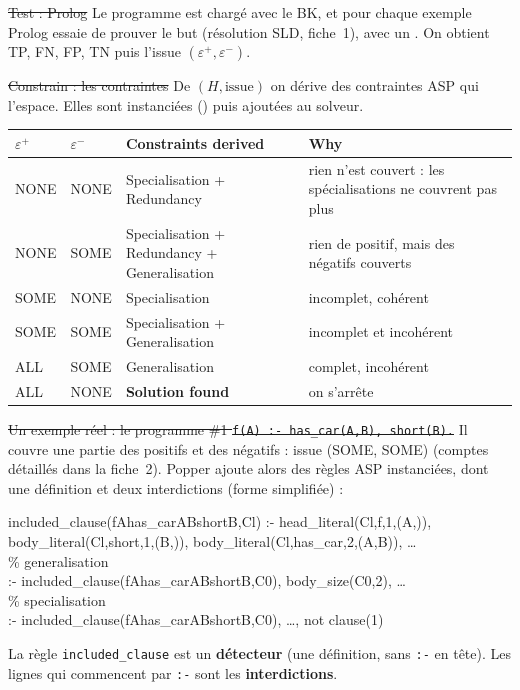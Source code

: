 \documentclass[10pt]{article}
\begin{document}
\st{Test : Prolog}
Le programme est chargé avec le BK, et pour chaque exemple Prolog essaie de prouver le but (résolution SLD, fiche~1), avec un .
On obtient TP, FN, FP, TN puis l'issue $(\varepsilon^+,\varepsilon^-)$.

\st{Constrain : les contraintes}
De $(H,\text{issue})$ on dérive des contraintes ASP qui  l'espace. Elles sont instanciées () puis ajoutées au solveur.

\renewcommand{\arraystretch}{1.25}
\begin{tabular}{@{}l l L{5.2cm} L{5.2cm}@{}}
$\varepsilon^+$ & $\varepsilon^-$ & \textbf{Constraints derived} & \textbf{Why}\\\hline
NONE & NONE & Specialisation + Redundancy & rien n'est couvert : les spécialisations ne couvrent pas plus\\
NONE & SOME & Specialisation + Redundancy + Generalisation & rien de positif, mais des négatifs couverts\\
SOME & NONE & Specialisation & incomplet, cohérent\\
SOME & SOME & Specialisation + Generalisation & incomplet et incohérent\\
ALL & SOME & Generalisation & complet, incohérent\\
ALL & NONE & \textbf{Solution found} & on s'arrête\\
\end{tabular}

\st{Un exemple réel : le programme \#1 \texttt{f(A) :- has\_car(A,B), short(B).}}
Il couvre une partie des positifs et des négatifs : issue (SOME, SOME) (comptes détaillés dans la fiche~2). Popper ajoute alors des règles ASP instanciées, dont une définition et deux interdictions (forme simplifiée) :
\begin{moi}\footnotesize\ttfamily
included\_clause(fAhas\_carABshortB,Cl) :- head\_literal(Cl,f,1,(A,)),\\
\hspace*{2em} body\_literal(Cl,short,1,(B,)), body\_literal(Cl,has\_car,2,(A,B)), \ldots\\[2pt]
\% generalisation\\
:- included\_clause(fAhas\_carABshortB,C0), body\_size(C0,2), \ldots\\
\% specialisation\\
:- included\_clause(fAhas\_carABshortB,C0), \ldots, not clause(1)
\end{moi}
La règle \texttt{included\_clause} est un \textbf{détecteur} (une définition, sans \texttt{:-} en tête). Les lignes qui commencent par \texttt{:-} sont les \textbf{interdictions}.
\end{document}
